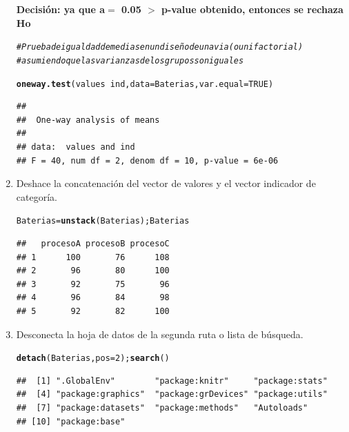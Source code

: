 \documentclass[12pt,letterpaper]{article}\usepackage[]{graphicx}\usepackage[]{color}
\makeatletter
\newcommand{\hlnum}[1]{\textcolor[rgb]{0.686,0.059,0.569}{#1}}%
\newcommand{\hlcom}[1]{\textcolor[rgb]{0.678,0.584,0.686}{\textit{#1}}}%
\newcommand{\hlopt}[1]{\textcolor[rgb]{0,0,0}{#1}}%
\newcommand{\hlstd}[1]{\textcolor[rgb]{0.345,0.345,0.345}{#1}}%
\newcommand{\hlkwb}[1]{\textcolor[rgb]{0.69,0.353,0.396}{#1}}%
\newcommand{\hlkwc}[1]{\textcolor[rgb]{0.333,0.667,0.333}{#1}}%
\newcommand{\hlkwd}[1]{\textcolor[rgb]{0.737,0.353,0.396}{\textbf{#1}}}%
\newenvironment{kframe}{%
 \def\at@end@of@kframe{}%
 \ifinner\ifhmode%
  \def\at@end@of@kframe{\end{minipage}}%
  \begin{minipage}{\columnwidth}%
 \fi\fi%
 \def\FrameCommand##1{\hskip\@totalleftmargin \hskip-\fboxsep
 \colorbox{shadecolor}{##1}\hskip-\fboxsep
     \hskip-\linewidth \hskip-\@totalleftmargin \hskip\columnwidth}%
 \MakeFramed {\advance\hsize-\width
   \@totalleftmargin\z@ \linewidth\hsize
   \@setminipage}}%
 {\par\unskip\endMakeFramed%
 \at@end@of@kframe}
\newenvironment{knitrout}{}{} %
\makeatother
\begin{document}
\begin{enumerate}
\textbf{Decisi\'on: ya que  a$=$ 0.05 $>$ p-value obtenido, entonces se rechaza Ho}

\begin{knitrout}
\color{fgcolor}\begin{kframe}
\begin{alltt}
\hlcom{# Prueba de igualdad de medias en un diseño de una via (o unifactorial) }
\hlcom{# asumiendo  que las varianzas de los grupos son iguales }

\hlkwd{oneway.test}\hlstd{(values}\hlopt{~}\hlstd{ind,} \hlkwc{data}\hlstd{=Baterias,} \hlkwc{var.equal} \hlstd{=} \hlnum{TRUE}\hlstd{)}
\end{alltt}
\begin{verbatim}
## 
## 	One-way analysis of means
## 
## data:  values and ind
## F = 40, num df = 2, denom df = 10, p-value = 6e-06
\end{verbatim}
\end{kframe}
\end{knitrout}

\item Deshace la concatenaci\'on del vector de valores y el vector indicador de categor\'ia. 

\begin{knitrout}
\color{fgcolor}\begin{kframe}
\begin{alltt}
\hlstd{Baterias} \hlkwb{=} \hlkwd{unstack}\hlstd{(Baterias);Baterias}
\end{alltt}
\begin{verbatim}
##   procesoA procesoB procesoC
## 1      100       76      108
## 2       96       80      100
## 3       92       75       96
## 4       96       84       98
## 5       92       82      100
\end{verbatim}
\end{kframe}
\end{knitrout}

\item Desconecta la hoja de datos de la segunda ruta o lista de b\'usqueda.

\begin{knitrout}
\color{fgcolor}\begin{kframe}
\begin{alltt}
\hlkwd{detach}\hlstd{(Baterias,} \hlkwc{pos}\hlstd{=}\hlnum{2}\hlstd{);} \hlkwd{search}\hlstd{()}
\end{alltt}
\begin{verbatim}
##  [1] ".GlobalEnv"        "package:knitr"     "package:stats"    
##  [4] "package:graphics"  "package:grDevices" "package:utils"    
##  [7] "package:datasets"  "package:methods"   "Autoloads"        
## [10] "package:base"
\end{verbatim}
\end{kframe}
\end{knitrout}

\end{enumerate}
\end{document}
